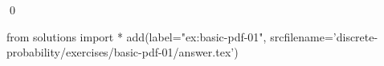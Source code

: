
\begin{ex} 
  \label{ex:basic-pdf-01}
  
  \qed
\end{ex} 
\begin{python0}
from solutions import *
add(label="ex:basic-pdf-01",
    srcfilename='discrete-probability/exercises/basic-pdf-01/answer.tex') 
\end{python0}
